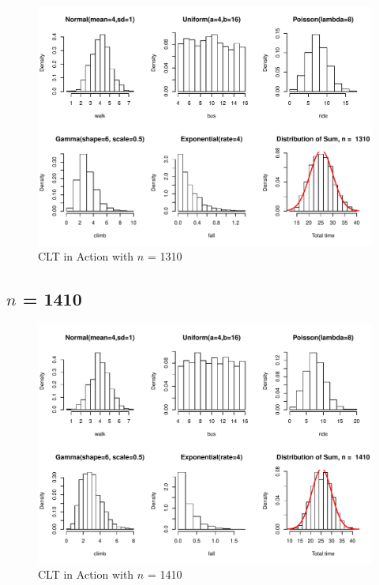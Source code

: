 \documentclass[11pt,letter]{article}\usepackage[]{graphicx}\usepackage[]{color}
\makeatletter
\def\maxwidth{ %
  \ifdim\Gin@nat@width>\linewidth
    \linewidth
  \else
    \Gin@nat@width
  \fi
}
\newenvironment{knitrout}{}{} %
\makeatother
\begin{document}
\begin{knitrout}
\color{fgcolor}\begin{figure}[h]

{\centering \includegraphics[width=\maxwidth]{figure/n-1310-1} 

}

\caption[CLT in Action with ]{CLT in Action with $n$ = 1310}\label{fig:n-1310}
\end{figure}


\end{knitrout}
\newpage
\subsection{$n$ = 1410}

\begin{knitrout}
\color{fgcolor}\begin{figure}[h]

{\centering \includegraphics[width=\maxwidth]{figure/n-1410-1} 

}

\caption[CLT in Action with ]{CLT in Action with $n$ = 1410}\label{fig:n-1410}
\end{figure}


\end{knitrout}
\newpage
\end{document}
